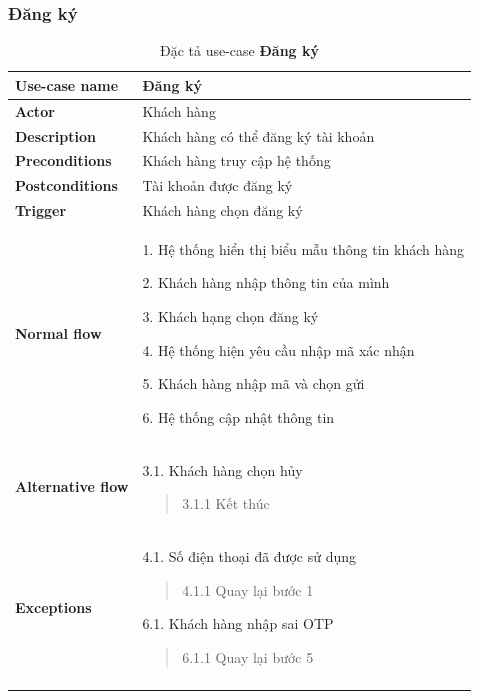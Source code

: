 \subsubsection{Đăng ký}
{
    \setlength\extrarowheight{6pt}
    \begin{longtable}{| p{} | p{} |}
        \hline
        \textbf{Use-case name}
         &
        Đăng ký
        \\
        \hline
        \textbf{Actor}
         &
        Khách hàng
        \\
        \hline
        \textbf{Description}
         &
        Khách hàng có thể đăng ký tài khoản
        \\
        \hline
        \textbf{Preconditions}
         &
        Khách hàng truy cập hệ thống
        \\
        \hline
        \textbf{Postconditions}
         &
        Tài khoản được đăng ký
        \\
        \hline
        \textbf{Trigger}
         &
        Khách hàng chọn đăng ký
        \\
        \hline
        \begin{flushleft}
            \textbf{Normal flow}
        \end{flushleft}
         &
        1. Hệ thống hiển thị biểu mẫu thông tin khách hàng

        2. Khách hàng nhập thông tin của mình

        3. Khách hạng chọn đăng ký

        4. Hệ thống hiện yêu cầu nhập mã xác nhận

        5. Khách hàng nhập mã và chọn gửi

        6. Hệ thống cập nhật thông tin
        \\
        \hline
        \begin{flushleft}
            \textbf{Alternative flow}
        \end{flushleft}
         &
        3.1. Khách hàng chọn hủy
        \begin{quote}
            3.1.1 Kết thúc
        \end{quote}
        \\
        \hline
        \begin{flushleft}
            \textbf{Exceptions}
        \end{flushleft}
         &
        4.1. Số điện thoại đã được sử dụng
        \begin{quote}
            4.1.1 Quay lại bước 1
        \end{quote}
        6.1. Khách hàng nhập sai OTP
        \begin{quote}
            6.1.1 Quay lại bước 5
        \end{quote}
        \\
        \hline
        \caption{Đặc tả use-case \textbf{Đăng ký}}
    \end{longtable}
}

